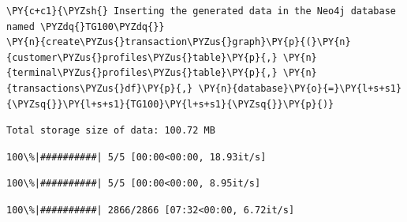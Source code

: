     \begin{tcolorbox}[breakable, size=fbox, boxrule=1pt, pad at break*=1mm,colback=cellbackground, colframe=cellborder]
\begin{Verbatim}[commandchars=\\\{\}]
\PY{c+c1}{\PYZsh{} Inserting the generated data in the Neo4j database named \PYZdq{}TG100\PYZdq{}}
\PY{n}{create\PYZus{}transaction\PYZus{}graph}\PY{p}{(}\PY{n}{customer\PYZus{}profiles\PYZus{}table}\PY{p}{,} \PY{n}{terminal\PYZus{}profiles\PYZus{}table}\PY{p}{,} \PY{n}{transactions\PYZus{}df}\PY{p}{,} \PY{n}{database}\PY{o}{=}\PY{l+s+s1}{\PYZsq{}}\PY{l+s+s1}{TG100}\PY{l+s+s1}{\PYZsq{}}\PY{p}{)}
\end{Verbatim}
\end{tcolorbox}

    \begin{Verbatim}[commandchars=\\\{\}]
Total storage size of data: 100.72 MB
    \end{Verbatim}

    
    \begin{Verbatim}[commandchars=\\\{\}]
  100\%|##########| 5/5 [00:00<00:00, 18.93it/s]
    \end{Verbatim}

    
    
    \begin{Verbatim}[commandchars=\\\{\}]
  100\%|##########| 5/5 [00:00<00:00, 8.95it/s]
    \end{Verbatim}

    
    
    \begin{Verbatim}[commandchars=\\\{\}]
  100\%|##########| 2866/2866 [07:32<00:00, 6.72it/s]
    \end{Verbatim}

    
    \begin{center}
    \end{center}
    { \hspace*{\fill} \\}
    
    \begin{center}
    \end{center}
    { \hspace*{\fill} \\}
    
